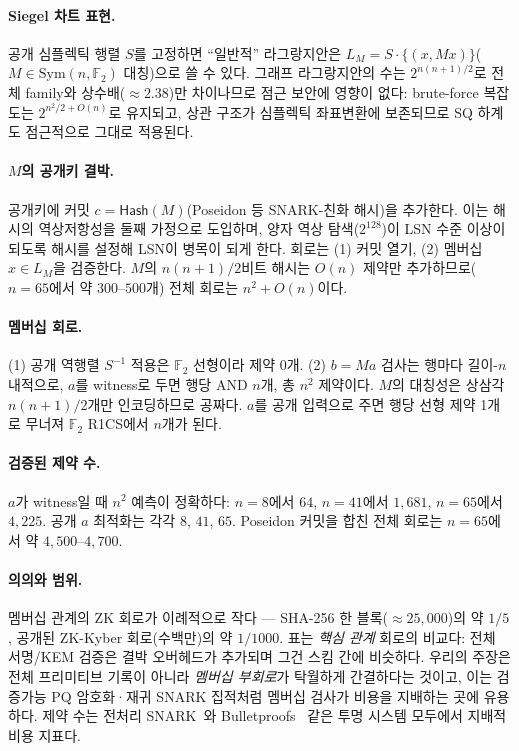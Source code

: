 \documentclass[11pt,a4paper]{article}
\theoremstyle{plain}
\theoremstyle{definition}
\newcommand{\F}{\mathbb{F}}
\begin{document}
\paragraph{Siegel 차트 표현.} 공개 심플렉틱 행렬 $S$를 고정하면 ``일반적'' 라그랑지안은 $L_M = S\cdot\{(x, Mx)\}$($M \in \mathrm{Sym}(n,\F_2)$ 대칭)으로 쓸 수 있다. 그래프 라그랑지안의 수는 $2^{n(n+1)/2}$로 전체 family와 상수배($\approx 2.38$)만 차이나므로 점근 보안에 영향이 없다: brute-force 복잡도는 $2^{n^2/2+O(n)}$로 유지되고, 상관 구조가 심플렉틱 좌표변환에 보존되므로 SQ 하계도 점근적으로 그대로 적용된다.

\paragraph{$M$의 공개키 결박.} 공개키에 커밋 $c = \mathsf{Hash}(M)$(Poseidon 등 SNARK-친화 해시)을 추가한다. 이는 해시의 역상저항성을 둘째 가정으로 도입하며, 양자 역상 탐색($2^{128}$)이 LSN 수준 이상이 되도록 해시를 설정해 LSN이 병목이 되게 한다. 회로는 (1) 커밋 열기, (2) 멤버십 $x \in L_M$을 검증한다. $M$의 $n(n+1)/2$비트 해시는 $O(n)$ 제약만 추가하므로($n=65$에서 약 $300$--$500$개) 전체 회로는 $n^2 + O(n)$이다.

\paragraph{멤버십 회로.} (1) 공개 역행렬 $S^{-1}$ 적용은 $\F_2$ 선형이라 제약 $0$개. (2) $b = Ma$ 검사는 행마다 길이-$n$ 내적으로, $a$를 witness로 두면 행당 AND $n$개, 총 $n^2$ 제약이다. $M$의 대칭성은 상삼각 $n(n+1)/2$개만 인코딩하므로 공짜다. $a$를 공개 입력으로 주면 행당 선형 제약 1개로 무너져 $\F_2$ R1CS에서 $n$개가 된다.

\paragraph{검증된 제약 수.} $a$가 witness일 때 $n^2$ 예측이 정확하다: $n=8$에서 $64$, $n=41$에서 $1{,}681$, $n=65$에서 $4{,}225$. 공개 $a$ 최적화는 각각 $8$, $41$, $65$. Poseidon 커밋을 합친 전체 회로는 $n=65$에서 약 $4{,}500$--$4{,}700$.

\paragraph{의의와 범위.} 멤버십 관계의 ZK 회로가 이례적으로 작다 --- SHA-256 한 블록($\approx 25{,}000$)의 약 $1/5$, 공개된 ZK-Kyber 회로(수백만)의 약 $1/1000$. 표는 \emph{핵심 관계} 회로의 비교다: 전체 서명/KEM 검증은 결박 오버헤드가 추가되며 그건 스킴 간에 비슷하다. 우리의 주장은 전체 프리미티브 기록이 아니라 \emph{멤버십 부회로}가 탁월하게 간결하다는 것이고, 이는 검증가능 PQ 암호화·재귀 SNARK 집적처럼 멤버십 검사가 비용을 지배하는 곳에 유용하다. 제약 수는 전처리 SNARK~\cite{GGPR13,Gro16}와 Bulletproofs~\cite{BBB+18} 같은 투명 시스템 모두에서 지배적 비용 지표다.
\end{document}
